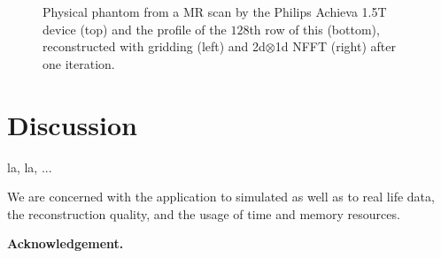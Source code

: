 \documentclass[journal]{IEEEtran}
\numberwithin{equation}{section}
\numberwithin{table}{section}
\numberwithin{figure}{section}
\begin{document}
\begin{figure}[ht]
\begin{tabular}{cc}
\end{tabular}
\caption{Physical phantom from a MR scan by the Philips Achieva 1.5T device (top) and the profile of the $128$th row of this (bottom), reconstructed
with gridding (left) and 2d$\otimes$1d NFFT (right) after one iteration.}
\label{Fig:Philips}
\end{figure}



\section{Discussion}\label{Sec:Dis}
la, la, ...

We are concerned with the application to simulated as well as to real life data, the reconstruction
quality, and the usage of time and memory resources.

{\bf Acknowledgement.}

%


\end{document}

